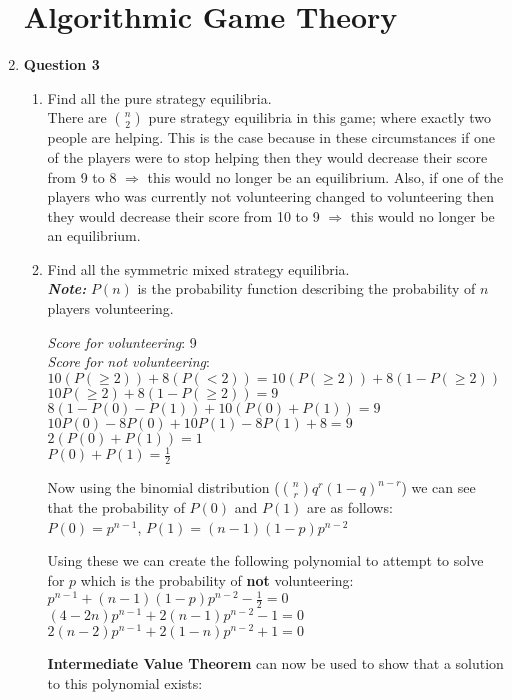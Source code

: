 \documentclass[12pt]{article}
\begin{document}
\begin{enumerate}
\section{Algorithmic Game Theory} 
\item \textbf{Question 3}
\begin{enumerate}
\item Find all the pure strategy equilibria. \\
There are $n \choose 2 $ pure strategy equilibria in this game; where exactly two people are helping. This is the case because in these circumstances if one of the players were to stop helping then they would decrease their score from 9 to 8 $\Rightarrow $ this would no longer be an equilibrium. Also, if one of the players who was currently not volunteering changed to volunteering then they would decrease their score from 10 to 9 $\Rightarrow $ this would no longer be an equilibrium.
\item Find all the symmetric mixed strategy equilibria. \\
\textit{\textbf{Note:}} $P(n)$ is the probability function describing the probability of $n$ players volunteering. \par
\textit{Score for volunteering}: 9\\
\textit{Score for not volunteering}:\\ $10(P(\geq 2)) + 8(P(<2)) = 10(P(\geq 2)) + 8(1-P(\geq 2))$ \\
$10P(\geq 2) + 8(1-P(\geq 2)) = 9$\\
$8(1-P(0)-P(1))+10(P(0)+P(1)) = 9$\\
$10P(0)-8P(0)+10P(1)-8P(1)+8 = 9$\\
$2(P(0)+P(1))=1$\\
$P(0)+P(1) = \frac{1}{2}$\par
Now using the binomial distribution (${n \choose r}q^r (1-q)^{n-r}$) we can see that the probability of $P(0)$ and $P(1)$ are as follows:\\
$P(0) = p^{n-1}$, $P(1)= (n-1)(1-p)p^{n-2} $\par
Using these we can create the following polynomial to attempt to solve for $p$ which is the probability of \textbf{not} volunteering:\\
$p^{n-1}+(n-1)(1-p)p^{n-2} -\frac{1}{2} = 0 $\\
$(4-2n)p^{n-1} + 2(n-1)p^{n-2} - 1 = 0$\\
$2(n-2)p^{n-1}+2(1-n)p^{n-2} +1 = 0$\par
\textbf{Intermediate Value Theorem} can now be used to show that a solution to this polynomial exists:\\

\end{enumerate}
\end{enumerate}
\end{document}
